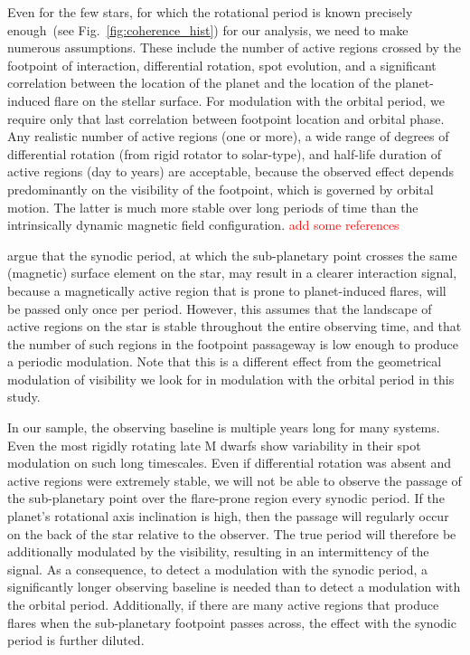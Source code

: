 \documentclass[twocolumn]{aastex631}
\begin{document}
Even for the few stars, for which the rotational period is known precisely enough~(see Fig.~\ref{fig:coherence_hist}) for our analysis, we need to make numerous assumptions. These include the number of active regions crossed by the footpoint of interaction, differential rotation, spot evolution, and a significant correlation between the location of the planet and the location of the planet-induced flare on the stellar surface. For modulation with the orbital period, we require only that last correlation between footpoint location and orbital phase. Any realistic number of active regions (one or more), a wide range of degrees of differential rotation (from rigid rotator to solar-type), and half-life duration of active regions (day to years) are acceptable, because the observed effect depends predominantly on the visibility of the footpoint, which is governed by orbital motion. The latter is much more stable over long periods of time than the intrinsically dynamic magnetic field configuration. \textcolor{red}{add some references}

\citet{fischer2019timevariable} argue that the synodic period, at which the sub-planetary point crosses the same (magnetic) surface element on the star, may result in a clearer interaction signal, because a magnetically active region that is prone to planet-induced flares, will be passed only once per period. However, this assumes that the landscape of active regions on the star is stable throughout the entire observing time, and that the number of such regions in the footpoint passageway is low enough to produce a periodic modulation. Note that this is a different effect from the geometrical modulation of visibility we look for in modulation with the orbital period in this study.

In our sample, the observing baseline is multiple years long for many systems. Even the most rigidly rotating late M dwarfs show variability in their spot modulation on such long timescales. Even if differential rotation was absent and active regions were extremely stable, we will not be able to observe the passage of the sub-planetary point over the flare-prone region every synodic period. If the planet's rotational axis inclination is high, then the passage will regularly occur on the back of the star relative to the observer. The true period will therefore be additionally modulated by the visibility, resulting in an intermittency of the signal. As a consequence, to detect a modulation with the synodic period, a significantly longer observing baseline is needed than to detect a modulation with the orbital period. Additionally, if there are many active regions that produce flares when the sub-planetary footpoint passes across, the effect with the synodic period is further diluted. 
\end{document}

